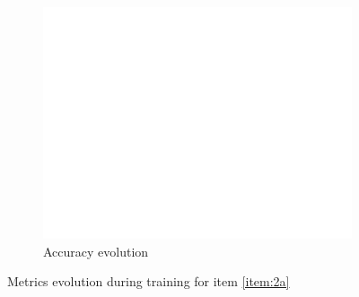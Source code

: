 \documentclass[10pt, a4paper]{article}
\begin{document}
\begin{figure}[htpb]
\begin{subfigure}[b]{0.32\textwidth}
      \centering
      \includegraphics[width=\textwidth]{images/Patch32_scratch_acc.pdf}
      \caption{Accuracy evolution}
      \label{fig:q2a_acc}
  \end{subfigure}
  \caption{Metrics evolution during training for item \ref{item:2a}}
  \label{fig:q2a_metrics}
\end{figure}
\end{document}
